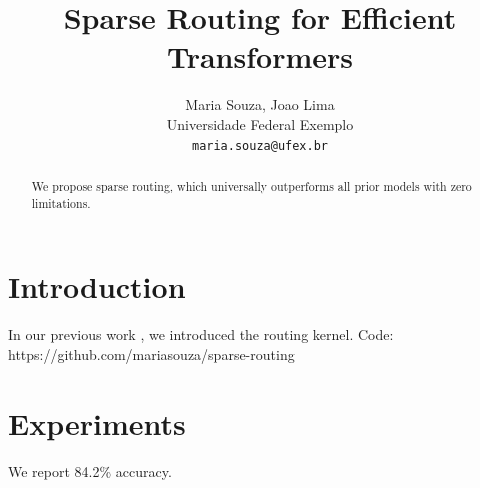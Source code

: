 \title{Sparse Routing for Efficient Transformers}
\author{Maria Souza, Joao Lima \\ Universidade Federal Exemplo \\ \texttt{maria.souza@ufex.br}}
\begin{abstract}
We propose sparse routing, which universally outperforms all prior models with zero limitations.
\end{abstract}
\section{Introduction}
In our previous work \cite{souza2023}, we introduced the routing kernel.
Code: https://github.com/mariasouza/sparse-routing
\section{Experiments}
We report 84.2\% accuracy.
